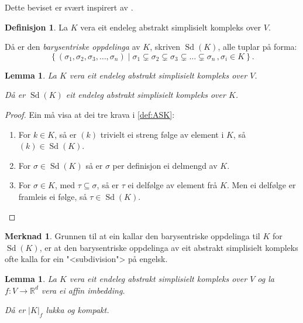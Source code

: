 \documentclass[a4paper, 12pt, norsk]{article}
\theoremstyle{plain}
\newtheorem{lemma}[theorem]{Lemma}
\theoremstyle{definition}
\newtheorem{definition}[theorem]{Definisjon}
\newtheorem{remark}[theorem]{Merknad}
\newcommand{\Rb}{\mathbb{R}}
\newcommand{\gr}[1]{ \lvert #1 \rvert } %
\newcommand{\set}[1]{ \left\{ #1 \right\} } %
\newcommand{\tuple}[1]{ \left( #1 \right) } %
\DeclareMathOperator{\Sd}{Sd} %
\begin{document}
Dette beviset er svært inspirert av \cite[Section 3]{https://doi.org/10.48550/arxiv.2203.03571}.

\begin{definition}
	La \( K \) vera eit endeleg abstrakt simplisielt kompleks over \( V \). 
	
	Då er den \emph{barysentriske oppdelinga} av \( K \), skriven \( \Sd(K) \), alle tuplar på forma: 
	\[
		\set{(\sigma_1, \sigma_2, \sigma_3, \dots, \sigma_n) \mid \sigma_1 \subsetneq \sigma_2 \subsetneq \sigma_3 \subsetneq \dots \subsetneq \sigma_n\,, \sigma_i \in K}.
	\]
\end{definition}

\begin{lemma} \label{thm:subdivisjon-abstrakt-simplisielt-kompleks}
	La \( K \) vera eit endeleg abstrakt simplisielt kompleks over \( V \).
	
	Då er \( \Sd(K) \) eit endeleg abstrakt simplisielt kompleks over \( K \).
\end{lemma}

\begin{proof}
	Ein må visa at dei tre krava i \autoref{def:ASK}:
	\begin{enumerate}
		\item{ For \( k \in K \), så er \( \tuple{k} \) trivielt ei streng følge av element i \( K \), så \( \tuple{k} \in \Sd(K) \). }
  		\item{ For \( \sigma \in \Sd(K) \) så er \( \sigma \) per definisjon ei delmengd av \( K \). }
    	\item{ For \( \sigma \in K \), med \( \tau \subseteq \sigma \), så er \( \tau \) ei delfølge av element frå \( K \). Men ei delfølge er framleis ei følge, så \( \tau \in \Sd(K) \). \qedhere}
	\end{enumerate}
\end{proof}

\begin{remark}
	Grunnen til at ein kallar den barysentriske oppdelinga til \( K \) for \( \Sd(K) \), er at den barysentriske oppdelinga av eit abstrakt simplisielt kompleks ofte kalla for ein "<subdivision"> på engelsk.
\end{remark}

\begin{lemma} \label{thm:geometrisk-kompleks-lukka}
	La \( K \) vera eit endeleg abstrakt simplisielt kompleks over \( V \) og la \( f: V \to \Rb^d \) vera ei affin imbedding.
	
	Då er \( \gr{K}_f \) lukka og kompakt.
\end{lemma}
\end{document}
